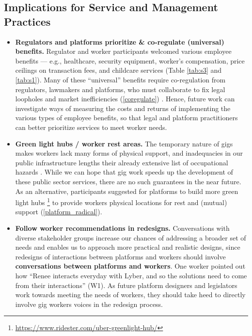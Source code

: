 \subsection{Implications for Service and Management Practices}
\begin{itemize}
    \item \textbf{Regulators and platforms prioritize \& co-regulate (universal) benefits.} Regulator and worker participants welcomed various employee benefits --- e.g., healthcare, security equipment, worker's compensation, price ceilings on transaction fees, and childcare services (Table \ref{tab:s3} and \ref{tab:s1}). Many of these ``universal'' benefits require co-regulation from regulators, lawmakers and platforms, who must collaborate to fix legal loopholes and market inefficiencies (\ref{coregulate}) \cite{cannon2014framework}. Hence, future work can investigate ways of measuring the costs and returns of implementing the various types of employee benefits, so that legal and platform practitioners can better prioritize services to meet worker needs.
    \item \textbf{Green light hubs / worker rest areas. }The temporary nature of gigs makes workers lack many forms of physical support, and inadequacies in our public infrastructure lengths their already extensive list of occupational hazards \cite{tran2017gig}. While we can hope that gig work speeds up the development of these public sector services, there are no such guarantees in the near future. As an alternative, participants suggested for platforms to build more green light hubs \footnote{\url{https://www.ridester.com/uber-greenlight-hub/}} to provide workers physical locations for rest and (mutual) support (\ref{platform_radical}).
    \item \textbf{Follow worker recommendations in redesigns.} Conversations with diverse stakeholder groups increase our chances of addressing a broader set of needs and enables us to approach more practical and realistic designs, since redesigns of interactions between platforms and workers should involve \textbf{conversations between platforms and workers}. One worker pointed out how ``Renee interacts everyday with Lyber, and so the solutions need to come from their interactions'' (W1). As future platform designers and legislators work towards meeting the needs of workers, they should take heed to directly involve gig workers voices in the redesign process.

\end{itemize}

